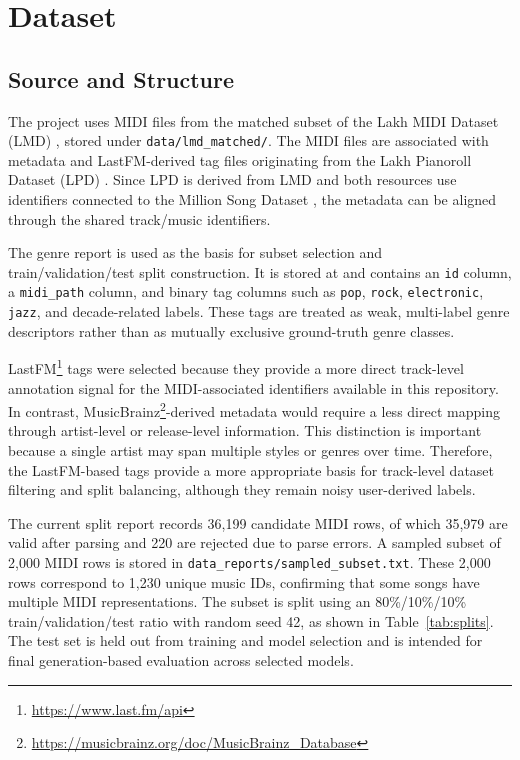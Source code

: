\section{Dataset}

\subsection{Source and Structure}

The project uses MIDI files from the matched subset of the Lakh MIDI Dataset (LMD) \citep{raffelcolinLearningBasedMethodsComparing2016}, stored under \verb|data/lmd_matched/|. The MIDI files are associated with metadata and LastFM-derived tag files originating from the Lakh Pianoroll Dataset (LPD) \citep{dongMuseGANMultitrackSequential2017}. Since LPD is derived from LMD and both resources use identifiers connected to the Million Song Dataset \citep{Bertin-Mahieux2011}, the metadata can be aligned through the shared track/music identifiers.

The genre report is used as the basis for subset selection and train/validation/test split construction. It is stored at  and contains an \verb|id| column, a \verb|midi_path| column, and binary tag columns such as \verb|pop|, \verb|rock|, \verb|electronic|, \verb|jazz|, and decade-related labels. These tags are treated as weak, multi-label genre descriptors rather than as mutually exclusive ground-truth genre classes.

LastFM\footnote{\url{https://www.last.fm/api}} tags were selected because they provide a more direct track-level annotation signal for the MIDI-associated identifiers available in this repository. In contrast, MusicBrainz\footnote{\url{https://musicbrainz.org/doc/MusicBrainz_Database}}-derived metadata would require a less direct mapping through artist-level or release-level information. This distinction is important because a single artist may span multiple styles or genres over time. Therefore, the LastFM-based tags provide a more appropriate basis for track-level dataset filtering and split balancing, although they remain noisy user-derived labels.

The current split report records 36,199 candidate MIDI rows, of which 35,979 are valid after parsing and 220 are rejected due to parse errors. A sampled subset of 2,000 MIDI rows is stored in \verb|data_reports/sampled_subset.txt|. These 2,000 rows correspond to 1,230 unique music IDs, confirming that some songs have multiple MIDI representations. The subset is split using an 80\%/10\%/10\% train/validation/test ratio with random seed 42, as shown in Table~\ref{tab:splits}. The test set is held out from training and model selection and is intended for final generation-based evaluation across selected models.

